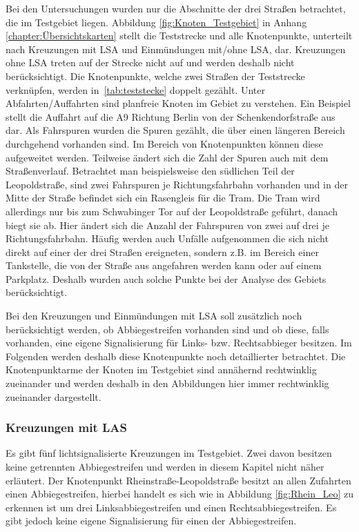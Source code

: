 Bei den Untersuchungen wurden nur die Abschnitte der drei Straßen betrachtet, die im Testgebiet liegen. Abbildung \ref{fig:Knoten_Testgebiet} in Anhang \ref{chapter:Übersichtskarten} stellt die Teststrecke und alle Knotenpunkte, unterteilt nach Kreuzungen mit LSA und Einmündungen mit/ohne LSA, dar. Kreuzungen ohne LSA treten auf der Strecke nicht auf und werden deshalb nicht berücksichtigt. Die Knotenpunkte, welche zwei Straßen der Teststrecke verknüpfen, werden in~\autoref{tab:teststecke} doppelt gezählt. Unter Abfahrten/Auffahrten sind planfreie Knoten im Gebiet zu verstehen. Ein Beispiel stellt die Auffahrt auf die A9 Richtung Berlin von der Schenkendorfstraße aus dar. Als Fahrspuren wurden die Spuren gezählt, die über einen längeren Bereich durchgehend vorhanden sind. Im Bereich von Knotenpunkten können diese aufgeweitet werden. Teilweise ändert sich die Zahl der Spuren auch mit dem Straßenverlauf. Betrachtet man beispielsweise den südlichen Teil der Leopoldstraße, sind zwei Fahrspuren je Richtungsfahrbahn vorhanden und in der Mitte der Straße befindet sich ein Rasengleis für die Tram. Die Tram wird allerdings nur bis zum Schwabinger Tor auf der Leopoldstraße geführt, danach biegt sie ab. Hier ändert sich die Anzahl der Fahrspuren von zwei auf drei je Richtungsfahrbahn. Häufig werden auch Unfälle aufgenommen die sich nicht direkt auf einer der drei Straßen ereigneten, sondern z.B. im Bereich einer Tankstelle, die von der Straße aus angefahren werden kann oder auf einem Parkplatz. Deshalb wurden auch solche Punkte bei der Analyse des Gebiets berücksichtigt.

Bei den Kreuzungen und Einmündungen mit LSA soll zusätzlich noch berücksichtigt werden, ob Abbiegestreifen vorhanden sind und ob diese, falls vorhanden, eine eigene Signalisierung für Links- bzw. Rechtsabbieger besitzen. Im Folgenden werden deshalb diese Knotenpunkte noch detaillierter betrachtet. Die Knotenpunktarme der Knoten im Testgebiet sind annähernd rechtwinklig zueinander und werden deshalb in den Abbildungen hier immer rechtwinklig zueinander dargestellt.

\subsubsection{Kreuzungen mit LAS}
Es gibt fünf lichtsignalisierte Kreuzungen im Testgebiet. Zwei davon besitzen keine getrennten Abbiegestreifen und werden in diesem Kapitel nicht näher erläutert. Der Knotenpunkt Rheinstraße-Leopoldstraße besitzt an allen Zufahrten einen Abbiegestreifen, hierbei handelt es sich wie in Abbildung \ref{fig:Rhein_Leo} zu erkennen ist um drei Linksabbiegestreifen und einen Rechtsabbiegestreifen. Es gibt jedoch keine eigene Signalisierung für einen der Abbiegestreifen. 

